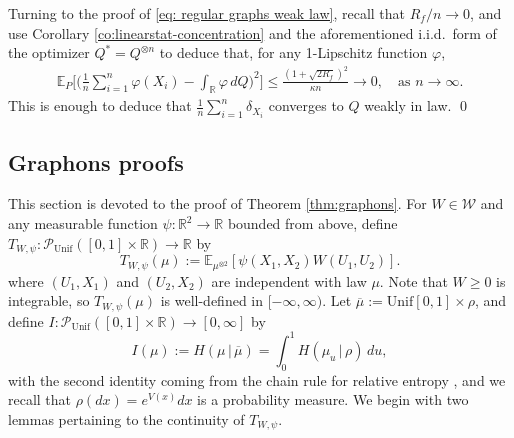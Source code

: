 \documentclass[11pt,reqno]{amsart}
\numberwithin{equation}{section}
\theoremstyle{definition}
\def\E{{\mathbb E}}
\def\R{{\mathbb R}}
\def\P{{\mathcal P}}
\def\Punif{\P_{\mathrm{Unif}}([0,1] \times \R)}
\begin{document}
Turning to the proof of \eqref{eq: regular graphs weak law}, recall that $R_f/n\to 0$, and use Corollary \ref{co:linearstat-concentration} and the aforementioned  i.i.d.\ form of the optimizer $ Q^\ast = Q^{\otimes n}$ to deduce that, for any 1-Lipschitz function $\varphi$,
\begin{align*}
\E_P\bigg[ \bigg(\frac{1}{n}\sum_{i=1}^n\varphi(X_i) - \int_\R \varphi\,dQ\bigg)^2\bigg]  \le \frac{(1 +  \sqrt{2R_f})^2}{\kappa n} \to 0, \quad \text{as } n \to \infty.
\end{align*}
This is enough to deduce that $\frac{1}{n}\sum_{i=1}^n\delta_{X_i}$ converges to $Q$ weakly in law. 
\hfill \qed




\subsection{Graphons proofs}

This section is devoted to the proof of Theorem \ref{thm:graphons}. 
For $W\in \mathcal{W}$ and any measurable function $\psi : \R^2 \to \R$ bounded from above, define  $T_{W,\psi} : \Punif \to \R$ by 
\begin{equation*}
T_{W,\psi}(\mu):= \E_{\mu^{\otimes 2}} \left[\psi(X_1,X_2) W(U_1,U_2)\right].
\end{equation*}
where $(U_1,X_1)$ and $(U_2,X_2)$ are independent with law $\mu$.
Note that $W \ge 0$ is integrable, so $T_{W,\psi}(\mu)$ is well-defined in $[-\infty,\infty)$. Let $\overline{\mu} := \mathrm{Unif}[0,1]\times \rho$,  and define $I : \Punif \to [0,\infty]$ by
\begin{equation*}
I(\mu):=H(\mu\,|\, \overline{\mu})=\int_0^1 H(\mu_u\,|\, \rho)\,du,
\end{equation*} 
with the second identity coming from the chain rule for relative entropy \cite[Theorem B.2.1]{dupuis2011weak}, and we recall that $\rho(dx)=e^{V(x)}dx$ is a probability measure. We begin with  two lemmas pertaining to the continuity of $T_{W,\psi}$.
\end{document}
